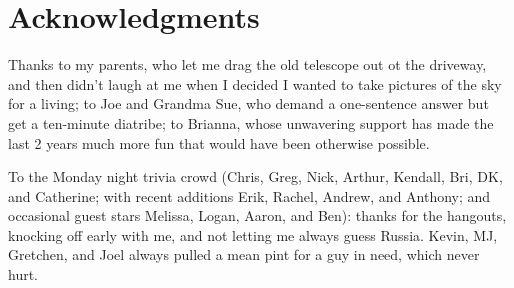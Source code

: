 \chapter*{Acknowledgments}

Thanks to my parents, who let me drag the old telescope out ot the driveway, and then didn't laugh at me when I decided I wanted to take pictures of the sky for a living; to Joe and Grandma Sue, who demand a one-sentence answer but get a ten-minute diatribe; to Brianna, whose unwavering support has made the last 2 years much more fun that would have been otherwise possible.

To the Monday night trivia crowd (Chris, Greg, Nick, Arthur, Kendall, Bri, DK, and Catherine; with recent additions Erik, Rachel, Andrew, and Anthony; and occasional guest stars Melissa, Logan, Aaron, and Ben): thanks for the hangouts, knocking off early with me, and not letting me always guess Russia. Kevin, MJ, Gretchen, and Joel always pulled a mean pint for a guy in need, which never hurt.